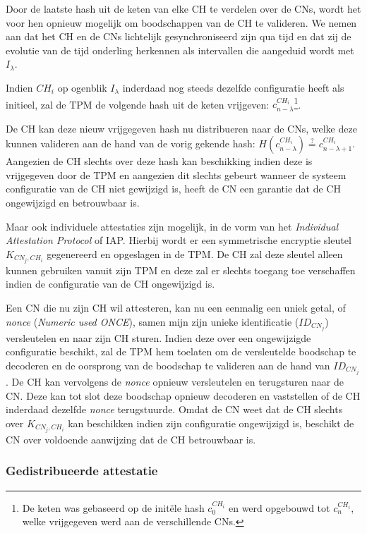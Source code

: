 Door de laatste hash uit de keten van elke CH te verdelen over de CNs, wordt
het voor hen opnieuw mogelijk om boodschappen van de CH te valideren. We nemen
aan dat het CH en de CNs lichtelijk gesynchroniseerd zijn qua tijd en dat zij
de evolutie van de tijd onderling herkennen als intervallen die aangeduid wordt
met $I_\lambda$.

Indien $CH_i$ op ogenblik $I_\lambda$ inderdaad nog steeds dezelfde
configuratie heeft als initieel, zal de TPM de volgende hash uit de keten
vrijgeven: $c_{n-\lambda}^{CH_i}$\footnote{De keten was gebaseerd op de
init\"ele hash $c_0^{CH_i}$ en werd opgebouwd tot $c_n^{CH_i}$, welke
vrijgegeven werd aan de verschillende CNs.}.

De CH kan deze nieuw vrijgegeven hash nu distribueren naar de CNs, welke deze
kunnen valideren aan de hand van de vorig gekende hash:
$H(c_{n-\lambda}^{CH_i}) \overset{?}{=} c_{n-\lambda+1}^{CH_i}$. Aangezien de
CH slechts over deze hash kan beschikking indien deze is vrijgegeven door de
TPM en aangezien dit slechts gebeurt wanneer de systeem configuratie van de CH
niet gewijzigd is, heeft de CN een garantie dat de CH ongewijzigd en
betrouwbaar is.

Maar ook individuele attestaties zijn mogelijk, in de vorm van het
\emph{Individual Attestation Protocol} of IAP. Hierbij wordt er een
symmetrische encryptie sleutel $K_{CN_j,CH_i}$ gegenereerd en opgeslagen in de
TPM. De CH zal deze sleutel alleen kunnen gebruiken vanuit zijn TPM en deze zal
er slechts toegang toe verschaffen indien de configuratie van de CH ongewijzigd
is.

Een CN die nu zijn CH wil attesteren, kan nu een eenmalig een uniek getal, of
\emph{nonce} (\emph{Numeric used ONCE}), samen mijn zijn unieke identificatie
($ID_{CN_j}$) versleutelen en naar zijn CH sturen. Indien deze over een
ongewijzigde configuratie beschikt, zal de TPM hem toelaten om de versleutelde
boodschap te decoderen en de oorsprong van de boodschap te valideren aan de
hand van $ID_{CN_j}$. De CH kan vervolgens de \emph{nonce} opnieuw versleutelen
en terugsturen naar de CN. Deze kan tot slot deze boodschap opnieuw decoderen
en vaststellen of de CH inderdaad dezelfde \emph{nonce} terugstuurde. Omdat de
CN weet dat de CH slechts over $K_{CN_j,CH_i}$ kan beschikken indien zijn
configuratie ongewijzigd is, beschikt de CN over voldoende aanwijzing dat de CH
betrouwbaar is.

\subsubsection*{Gedistribueerde attestatie}

